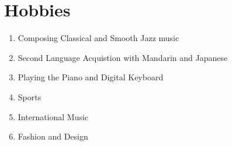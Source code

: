 \documentclass{ResumeDesignFormat2}
\begin{document}
\section{Hobbies}

\begin{enumerate}
\item Composing Classical and Smooth Jazz music
\item Second Language Acquistion with Mandarin and Japanese
\item Playing the Piano and Digital Keyboard 
\item Sports
\item International Music
\item Fashion and Design
\end{enumerate}
\end{document}
